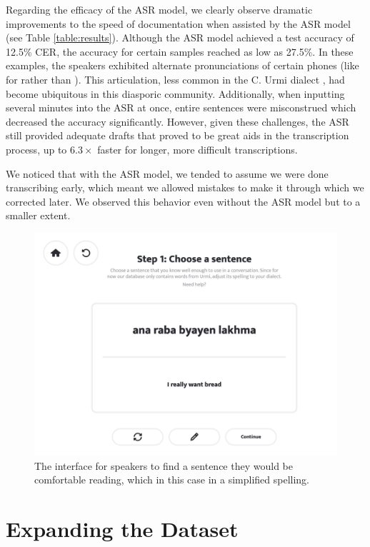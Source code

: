 \documentclass[letterpaper]{article} %
\begin{document}
Regarding the efficacy of the ASR model, we clearly observe dramatic improvements to the speed of documentation when assisted by the ASR model (see Table \ref{table:results}). Although the ASR model achieved a test accuracy of 12.5\% CER, the accuracy for certain samples reached as low as 27.5\%. In these examples, the speakers exhibited alternate pronunciations of certain phones (like \textipa{[\textdyoghlig]} for \textipa{/\textObardotlessj/} rather than \textipa{[G]}). This articulation, less common in the C. Urmi dialect \cite{khan2016neo}, had become ubiquitous in this diasporic community. Additionally, when inputting several minutes into the ASR at once, entire sentences were misconstrued which  decreased the accuracy significantly. However, given these challenges, the ASR still provided adequate drafts that proved to be great aids in the transcription process, up to $6.3\times$ faster for longer, more difficult transcriptions.

We noticed that with the ASR model, we tended to assume we were done transcribing early, which meant we allowed mistakes to make it through which we corrected later. We observed this behavior even without the ASR model but to a smaller extent.

\begin{figure}[t]
    \centering
    \includegraphics[width=1\columnwidth]{website.png}
    \caption{The interface for speakers to find a sentence they would be comfortable reading, which in this case in a simplified spelling.}
    \label{website}
\end{figure}

\section{Expanding the Dataset}
\label{sec:expanding}
\end{document}
